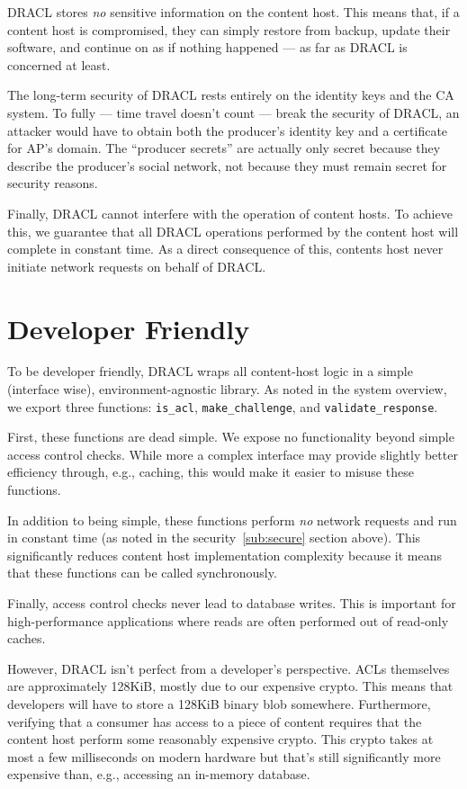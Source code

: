 \documentclass[pdftex,12pt,a4papaer,twoside,notitlepage]{report}
\begin{document}
DRACL stores \emph{no} sensitive information on the content host. This means
that, if a content host is compromised, they can simply restore from backup,
update their software, and continue on as if nothing happened --- as far as
DRACL is concerned at least.

The long-term security of DRACL rests entirely on the identity keys and the CA
system. To fully --- time travel doesn't count --- break the security of DRACL,
an attacker would have to obtain both the producer's identity key and a
certificate for AP's domain. The ``producer secrets'' are actually only secret
because they describe the producer's social network, not because they must
remain secret for security reasons.

Finally, DRACL cannot interfere with the operation of content hosts. To achieve
this, we guarantee that all DRACL operations performed by the content host will
complete in constant time. As a direct consequence of this, contents host never
initiate network requests on behalf of DRACL\@.

\section{Developer Friendly}

To be developer friendly, DRACL wraps all content-host logic in a simple
(interface wise), environment-agnostic library. As noted in the system overview,
we export three functions: \verb=is_acl=, \verb=make_challenge=, and
\verb=validate_response=.

First, these functions are dead simple. We expose no functionality beyond simple
access control checks. While more a complex interface may provide slightly better
efficiency through, e.g., caching, this would make it easier to misuse these
functions.

In addition to being simple, these functions perform \emph{no} network requests
and run in constant time (as noted in the security~\ref{sub:secure} section
above). This significantly reduces content host implementation complexity
because it means that these functions can be called synchronously.

Finally, access control checks never lead to database writes. This is important
for high-performance applications where reads are often performed out of
read-only caches.

However, DRACL isn't perfect from a developer's perspective. ACLs themselves are
approximately 128KiB, mostly due to our expensive crypto. This means that
developers will have to store a 128KiB binary blob somewhere. Furthermore,
verifying that a consumer has access to a piece of content requires that the
content host perform some reasonably expensive crypto. This crypto takes at most
a few milliseconds on modern hardware but that's still significantly more
expensive than, e.g., accessing an in-memory database.
\end{document}
